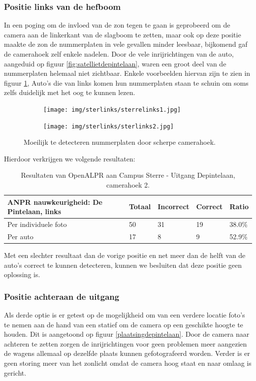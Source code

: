 \subsubsection{Positie links van de hefboom}
In een poging om de invloed van de zon tegen te gaan is geprobeerd om de camera aan de linkerkant van de slagboom te zetten, maar ook op deze positie maakte de zon de nummerplaten in vele gevallen minder leesbaar, bijkomend gaf de camerahoek zelf enkele nadelen. Door de vele inrijrichtingen van de auto, aangeduid op figuur \ref{fig:satellietdepintelaan}, waren een groot deel van de nummerplaten helemaal niet zichtbaar. Enkele voorbeelden hiervan zijn te zien in figuur \ref{fig:sterre-links}, Auto's die van links komen hun nummerplaten staan te schuin om soms zelfs duidelijk met het oog te kunnen lezen.

\begin{figure}[h!]
	\centering
	\begin{subfigure}[b]{0.4\linewidth}
		\texttt{[image: img/sterlinks/sterrelinks1.jpg]}
	\end{subfigure}
	\begin{subfigure}[b]{0.4\linewidth}
		\texttt{[image: img/sterlinks/sterlinks2.jpg]}
	\end{subfigure}
	\caption{Moeilijk te detecteren nummerplaten door scherpe camerahoek.}
	\label{fig:sterre-links}
\end{figure}

Hierdoor verkrijgen we volgende resultaten:
\begin{table}[h!]
	\centering
	\begin{tabular}{l|l|l|l|l}
		\textbf{ANPR nauwkeurigheid: De Pintelaan, links} & Totaal & Incorrect & Correct & Ratio	\\ \hline
		Per individuele foto 	& 50 & 31	& 19	& 38.0\%\\
		Per auto				& 17 & 8	& 9 	& 52.9\%\\
	\end{tabular}
\caption{Resultaten van OpenALPR aan Campus Sterre - Uitgang Depintelaan, camerahoek 2.}
\label{tab:alprdepintelaan2}
\end{table}

Met een slechter resultaat dan de vorige positie en net meer dan de helft van de auto's correct te kunnen detecteren, kunnen we besluiten dat deze positie geen oplossing is.

\subsubsection{Positie achteraan de uitgang}
Als derde optie is er getest op de mogelijkheid om van een verdere locatie foto's te nemen aan de hand van een statief om de camera op een geschikte hoogte te houden. Dit is aangetoond op figuur \ref{plaatsingdepintelaan}. Door de camera naar achteren te zetten zorgen de inrijrichtingen voor geen problemen meer aangezien de wagens allemaal op dezelfde plaats kunnen gefotografeerd worden. Verder is er geen storing meer van het zonlicht omdat de camera hoog staat en naar omlaag is gericht.

